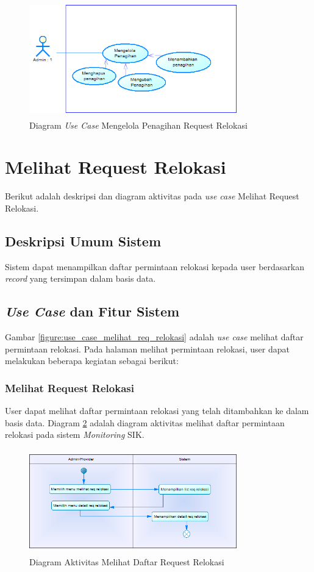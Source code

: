 	\begin{figure}[h]
	\centerline {\includegraphics[width=9cm,height=5cm]{bab4/use-case-mengelola-penagihan.png}}
	\caption{Diagram \textit{Use Case} Mengelola Penagihan Request Relokasi}
	\label{figure:use_case_mengelola_penagihan}
	\end{figure}

\section{Melihat Request Relokasi}
Berikut adalah deskripsi dan diagram aktivitas pada \textit{use case} Melihat Request Relokasi.
\subsection{Deskripsi Umum Sistem}
\tab Sistem dapat menampilkan daftar permintaan relokasi kepada user berdasarkan \textit{record} yang tersimpan dalam basis data.
\subsection{\textit{Use Case} dan Fitur Sistem}
Gambar \ref{figure:use_case_melihat_req_relokasi} adalah \textit{use case} melihat daftar permintaan relokasi. Pada halaman melihat permintaan relokasi, user dapat melakukan beberapa kegiatan sebagai berikut:
	\subsubsection{Melihat Request Relokasi}
	User dapat melihat daftar permintaan relokasi yang telah ditambahkan ke dalam basis data. Diagram \ref{figure:activity_melihat_req_relokasi} adalah diagram aktivitas melihat daftar permintaan relokasi pada sistem \textit{Monitoring} SIK.
	\begin{figure}[h]
	\centerline {\includegraphics[width=9cm,height=4.5cm]{bab4/ActivityDiagram_MelihatReqRelokasi.png}}
	\caption{Diagram Aktivitas Melihat Daftar Request Relokasi}
	\label{figure:activity_melihat_req_relokasi}
	\end{figure}
	
